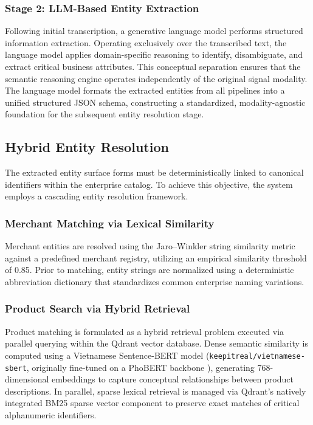 \subsubsection{Stage 2: LLM-Based Entity Extraction}
Following initial transcription, a generative language model performs structured information extraction. Operating exclusively over the transcribed text, the language model applies domain-specific reasoning to identify, disambiguate, and extract critical business attributes. This conceptual separation ensures that the semantic reasoning engine operates independently of the original signal modality. The language model formats the extracted entities from all pipelines into a unified structured JSON schema, constructing a standardized, modality-agnostic foundation for the subsequent entity resolution stage.

\subsection{Hybrid Entity Resolution}
The extracted entity surface forms must be deterministically linked to canonical identifiers within the enterprise catalog. To achieve this objective, the system employs a cascading entity resolution framework.

\subsubsection{Merchant Matching via Lexical Similarity}
Merchant entities are resolved using the Jaro–Winkler string similarity metric \parencite{winkler1990string} against a predefined merchant registry, utilizing an empirical similarity threshold of 0.85. Prior to matching, entity strings are normalized using a deterministic abbreviation dictionary that standardizes common enterprise naming variations.

\subsubsection{Product Search via Hybrid Retrieval}
Product matching is formulated as a hybrid retrieval problem executed via parallel querying within the Qdrant vector database. Dense semantic similarity is computed using a Vietnamese Sentence-BERT model \parencite{reimers2019sentence} (\texttt{keepitreal/vietnamese-sbert}, originally fine-tuned on a PhoBERT backbone \parencite{nguyen2020phobert}), generating 768-dimensional embeddings to capture conceptual relationships between product descriptions. In parallel, sparse lexical retrieval is managed via Qdrant's natively integrated BM25 sparse vector component \parencite{robertson2009probabilistic} to preserve exact matches of critical alphanumeric identifiers. 

